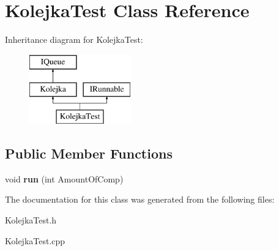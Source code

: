 \hypertarget{class_kolejka_test}{\section{Kolejka\-Test Class Reference}
\label{class_kolejka_test}
}
Inheritance diagram for Kolejka\-Test\-:\begin{figure}[H]
\begin{center}
\leavevmode
\includegraphics[height=3.000000cm]{class_kolejka_test}
\end{center}
\end{figure}
\subsection*{Public Member Functions}
\begin{DoxyCompactItemize}
\item 
\hypertarget{class_kolejka_test_a3a0bf78ef7f07ce376a60e7a205f7b45}{void {\bfseries run} (int Amount\-Of\-Comp)}\label{class_kolejka_test_a3a0bf78ef7f07ce376a60e7a205f7b45}

\end{DoxyCompactItemize}


The documentation for this class was generated from the following files\-:\begin{DoxyCompactItemize}
\item 
Kolejka\-Test.\-h\item 
Kolejka\-Test.\-cpp\end{DoxyCompactItemize}
